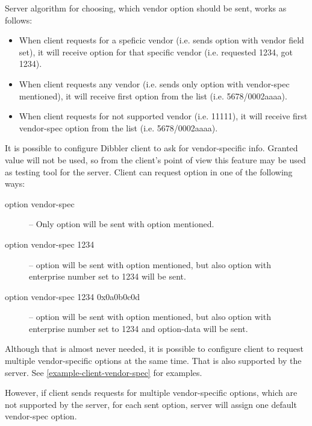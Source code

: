 Server algorithm for choosing, which vendor option should be sent,
works as follows:

\begin{itemize}
\item When client requests for a speficic vendor (i.e. sends
   option with vendor field set), it will
  receive option for that specific vendor (i.e. requested 1234, got
  1234).
 \item When client requests any vendor (i.e. sends only  option with vendor-spec mentioned), it will receive first
    option from the list (i.e. 5678/0002aaaa).
 \item When client requests for not supported vendor (i.e. 11111), it
   will receive first vendor-spec option from the list
   (i.e. 5678/0002aaaa).
\end{itemize}

It is possible to configure Dibbler client to ask for vendor-specific
info. Granted value will not be used, so from the client's point of
view this feature may be used as testing tool for the server. Client
can request  option in one of the
following ways:

\begin{description}
\item[option vendor-spec] -- Only  option will be
  sent with  option mentioned.
\item[option vendor-spec 1234] --  option will be
  sent with  option mentioned, but also
   option with enterprise number set to 1234
  will be sent.
\item[option vendor-spec 1234 0x0a0b0c0d] -- 
  option will be sent with  option mentioned,
  but also  option with enterprise number set to
  1234 and option-data will be sent.
\end{description}

Although that is almost never needed, it is possible to configure
client to request multiple vendor-specific options at the same
time. That is also supported by the server. See
\ref{example-client-vendor-spec} for examples.


However, if client sends requests for multiple vendor-specific
options, which are not supported by the server, for each sent option,
server will assign one default vendor-spec option.

